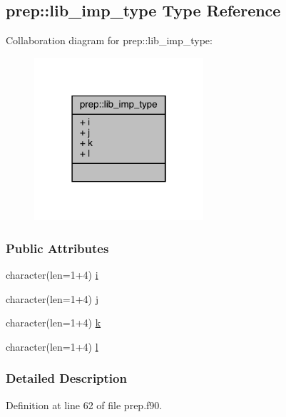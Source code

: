 \hypertarget{structprep_1_1lib__imp__type}{\subsection{prep\-:\-:lib\-\_\-imp\-\_\-type Type Reference}
\label{structprep_1_1lib__imp__type}
}


Collaboration diagram for prep\-:\-:lib\-\_\-imp\-\_\-type\-:
\nopagebreak
\begin{figure}[H]
\begin{center}
\leavevmode
\includegraphics[width=178pt]{structprep_1_1lib__imp__type__coll__graph}
\end{center}
\end{figure}
\subsubsection*{Public Attributes}
\begin{DoxyCompactItemize}
\item 
character(len=1+4) \hyperlink{structprep_1_1lib__imp__type_ab715321e4b7a49dea3499cbb88309e7c}{i}
\item 
character(len=1+4) \hyperlink{structprep_1_1lib__imp__type_a9ce08aa65e4adf5ee7b0e3cd9e282118}{j}
\item 
character(len=1+4) \hyperlink{structprep_1_1lib__imp__type_af4dbcd696da7d0c3fff40a717ee2d715}{k}
\item 
character(len=1+4) \hyperlink{structprep_1_1lib__imp__type_ae695028b663d39353cd9f7d9d3c286c1}{l}
\end{DoxyCompactItemize}


\subsubsection{Detailed Description}


Definition at line 62 of file prep.\-f90.



